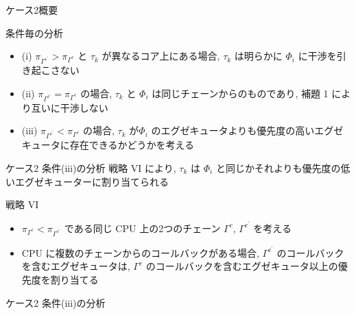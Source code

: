 \begin{frame}{ケース2概要}
\end{frame}

\begin{frame}{条件毎の分析}
    \begin{itemize}
        \item (i) $\pi_{\Gamma^{c^{\prime}}}>\pi_{\Gamma^{c}}$ と $\tau_{k}$ が異なるコア上にある場合, $\tau_{k}$ は明らかに $\Phi_{i}$ に干渉を引き起こさない
        \item (ii) $\pi_{\Gamma^{c^{\prime}}}=\pi_{\Gamma^{c}}$ の場合, $\tau_{k}$ と $\Phi_{i}$ は同じチェーンからのものであり, 補題 1 により互いに干渉しない
        \item (iii) $\pi_{\Gamma^{c^{\prime}}}<\pi_{\Gamma^{c}}$ の場合, $\tau_{k}$ が$\Phi_{i}$ のエグゼキュータよりも優先度の高いエグゼキュータに存在できるかどうかを考える
    \end{itemize}
\end{frame}

\begin{frame}{ケース2 条件(iii)の分析}
    戦略 VI により, $\tau_{k}$ は $\Phi_{i}$ と同じかそれよりも優先度の低いエグゼキューターに割り当てられる
    \begin{block}{戦略 VI}
        \setlength{\linewidth}{0.98\columnwidth}
        \begin{itemize}
            \item $\pi_{\Gamma^{c}}<\pi_{\Gamma^{c^{\prime}}}$ である同じ CPU 上の2つのチェーン $\Gamma^{c}$, $\Gamma^{c^{\prime}}$ を考える
            \item CPU に複数のチェーンからのコールバックがある場合, $\Gamma^{c^{\prime}}$ のコールバックを含むエグゼキュータは, $\Gamma^{c}$ のコールバックを含むエグゼキュータ以上の優先度を割り当てる
        \end{itemize}
    \end{block}
\end{frame}

\begin{frame}{ケース2 条件(iii)の分析}
\end{frame}


